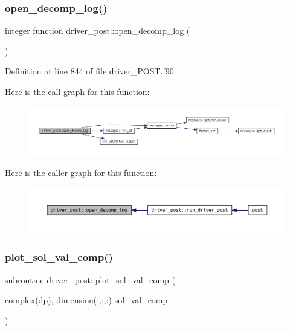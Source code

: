 \subsubsection{\texorpdfstring{open\+\_\+decomp\+\_\+log()}{open\_decomp\_log()}}
{\footnotesize\ttfamily integer function driver\+\_\+post\+::open\+\_\+decomp\+\_\+log (\begin{DoxyParamCaption}{ }\end{DoxyParamCaption})}



Definition at line 844 of file driver\+\_\+\+P\+O\+S\+T.\+f90.

Here is the call graph for this function\+:
\nopagebreak
\begin{figure}[H]
\begin{center}
\leavevmode
\includegraphics[width=350pt]{namespacedriver__post_a5d76f87f131e21b4d74fd5f4a7bbbd6b_cgraph}
\end{center}
\end{figure}
Here is the caller graph for this function\+:
\nopagebreak
\begin{figure}[H]
\begin{center}
\leavevmode
\includegraphics[width=350pt]{namespacedriver__post_a5d76f87f131e21b4d74fd5f4a7bbbd6b_icgraph}
\end{center}
\end{figure}
\mbox{\label{namespacedriver__post_af9ce961d2d6825b767a93fdbe8806a1c}} 
\subsubsection{\texorpdfstring{plot\+\_\+sol\+\_\+val\+\_\+comp()}{plot\_sol\_val\_comp()}}
{\footnotesize\ttfamily subroutine driver\+\_\+post\+::plot\+\_\+sol\+\_\+val\+\_\+comp (\begin{DoxyParamCaption}\item[{complex(dp), dimension(\+:,\+:,\+:)}]{sol\+\_\+val\+\_\+comp }\end{DoxyParamCaption})}



